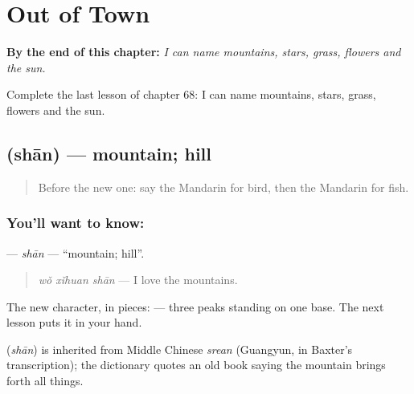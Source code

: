 
\chapter{Out of Town}
\label{ch:zh-out-of-town}

\begin{chapteropening}
\textbf{By the end of this chapter:} \emph{I can name mountains, stars, grass, flowers and the sun.}

Complete the last lesson of chapter 68: I can name mountains, stars, grass, flowers and the sun.
\end{chapteropening}

\section[\texorpdfstring{\zh{山} (shān)}{山 (shān)}]{ (shān) — mountain; hill}

\label{lesson:ZH-C68-shan}



\begin{quote}
Before the new one: say the Mandarin for bird, then the Mandarin for fish.
\end{quote}

\subsection*{You'll want to know: }
\textbf{} — \emph{shān} — \textquotedblleft{}mountain; hill\textquotedblright{}.

\begin{quote}
\textbf{} \emph{wǒ xǐhuan shān} — I love the mountains.
\end{quote}

The new character, in pieces:  — three peaks standing on one base. The next lesson puts it in your hand.

\begin{cousinweb}
\textbf{} (\emph{shān}) is inherited from Middle Chinese \emph{srean} (Guangyun, in Baxter's transcription); the dictionary quotes an old book saying the mountain brings forth all things.
\end{cousinweb}

